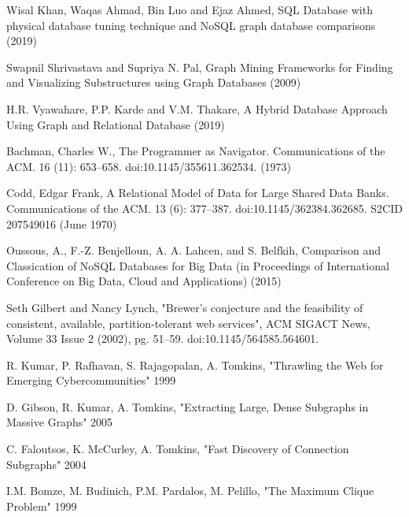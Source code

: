 \documentclass[10pt,        %
               a4paper,     %
               journal,     %
               ]{IEEEtran}
\begin{document}
\begin{thebibliography}{3}

Wisal Khan, Waqas Ahmad, Bin Luo and Ejaz Ahmed, SQL Database with physical database tuning technique and NoSQL graph database comparisons
(2019)

Swapnil Shrivastava and Supriya N. Pal, Graph Mining Frameworks for Finding and Visualizing Substructures using Graph Databases
(2009)

H.R. Vyawahare, P.P. Karde and V.M. Thakare, A Hybrid Database Approach Using Graph and Relational Database
(2019)

Bachman, Charles W., The Programmer as Navigator. Communications of the ACM. 16 (11): 653–658. doi:10.1145/355611.362534.
(1973)

Codd, Edgar Frank, A Relational Model of Data for Large Shared Data Banks. Communications of the ACM. 13 (6): 377–387. doi:10.1145/362384.362685. S2CID 207549016
(June 1970)

Oussous, A., F.-Z. Benjelloun, A. A. Lahcen, and S. Belfkih, Comparison and Classication of NoSQL Databases for Big Data (in Proceedings of International Conference on Big Data, Cloud and Applications)
(2015)

Seth Gilbert and Nancy Lynch, "Brewer's conjecture and the feasibility of consistent, available, partition-tolerant web services", ACM SIGACT News, Volume 33 Issue 2 (2002), pg. 51–59. doi:10.1145/564585.564601.

R. Kumar, P. Rafhavan, S. Rajagopalan, A. Tomkins, "Thrawling the Web for Emerging Cybercommunities" 1999

D. Gibson, R. Kumar, A. Tomkins, "Extracting Large, Dense Subgraphs in Massive Graphs" 2005

C. Faloutsos, K. McCurley, A. Tomkins, "Fast Discovery of Connection Subgraphs" 2004

I.M. Bomze, M. Budinich, P.M. Pardalos, M. Pelillo, "The Maximum Clique Problem" 1999

\end{thebibliography}
\end{document}
